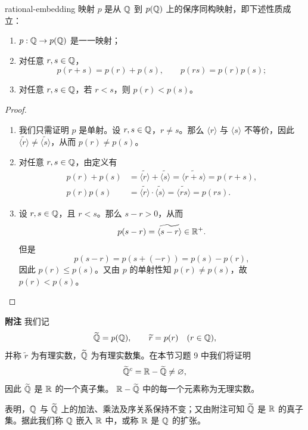\begin{mythm}{}{rational-embedding}
映射 \(p\) 是从 \(\mathbb{Q}\) 到 \(p(\mathbb{Q})\) 上的保序同构映射，即下述性质成立：
\begin{enumerate}[label=\arabic*)]
  \item \(p:\mathbb{Q}\to p(\mathbb{Q})\) 是一一映射；
  \item 对任意 \(r,s\in\mathbb{Q}\)，
  \[
  p(r+s)=p(r)+p(s),
  \qquad
  p(rs)=p(r)p(s);
  \]
  \item 对任意 \(r,s\in\mathbb{Q}\)，若 \(r<s\)，则 \(p(r)<p(s)\)。
\end{enumerate}
\end{mythm}

\begin{proof}
\begin{enumerate}[label=\arabic*)]
  \item 我们只需证明 \(p\) 是单射。设 \(r,s\in\mathbb{Q}\)，\(r\neq s\)。那么
  \(\langle r\rangle\) 与 \(\langle s\rangle\) 不等价，因此
  \(\widetilde{\langle r\rangle}\neq\widetilde{\langle s\rangle}\)，从而
  \(p(r)\neq p(s)\)。

  \item 对任意 \(r,s\in\mathbb{Q}\)，由定义有
  \begin{align*}
  p(r)+p(s)
  &=\widetilde{\langle r\rangle}+\widetilde{\langle s\rangle}
   =\widetilde{\langle r+s\rangle}=p(r+s),\\
  p(r)p(s)
  &=\widetilde{\langle r\rangle}\cdot\widetilde{\langle s\rangle}
   =\widetilde{\langle rs\rangle}=p(rs).
  \end{align*}

  \item 设 \(r,s\in\mathbb{Q}\)，且 \(r<s\)。那么 \(s-r>0\)，从而
  \[
  p(s-r)=\widetilde{\langle s-r\rangle}\in\mathbb{R}^+.
  \]
  但是
  \[
  p(s-r)=p(s+(-r))=p(s)-p(r),
  \]
  因此 \(p(r)\leq p(s)\)。又由 \(p\) 的单射性知
  \(p(r)\neq p(s)\)，故 \(p(r)<p(s)\)。
\end{enumerate}
\end{proof}

\textbf{附注}\quad
我们记
\[
\widetilde{\mathbb{Q}}=p(\mathbb{Q}),
\qquad
\widetilde r=p(r)\quad(r\in\mathbb{Q}),
\]
并称 \(\widetilde r\) 为有理实数，\(\widetilde{\mathbb{Q}}\) 为有理实数集。在本节习题 9 中我们将证明
\[
\widetilde{\mathbb{Q}}^{c}=\mathbb{R}-\widetilde{\mathbb{Q}}\neq\varnothing,
\]
因此 \(\widetilde{\mathbb{Q}}\) 是 \(\mathbb{R}\) 的一个真子集。
\(\mathbb{R}-\widetilde{\mathbb{Q}}\) 中的每一个元素称为无理实数。

表明，\(\mathbb{Q}\) 与 \(\widetilde{\mathbb{Q}}\) 上的加法、乘法及序关系保持不变；又由附注可知
\(\widetilde{\mathbb{Q}}\) 是 \(\mathbb{R}\) 的真子集。据此我们称 \(\mathbb{Q}\) 嵌入 \(\mathbb{R}\) 中，或称
\(\mathbb{R}\) 是 \(\mathbb{Q}\) 的扩张。

